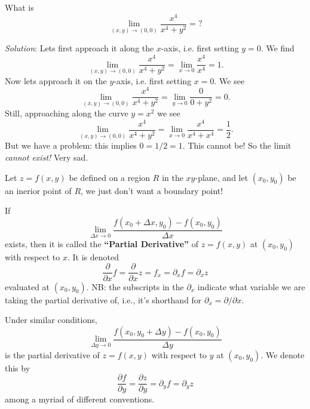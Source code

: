 \begin{example}
What is
\begin{equation}
\lim_{(x,y)\to(0,0)}\frac{x^{4}}{x^{4}+y^{2}}=?
\end{equation}

\emph{Solution}: Lets first approach it along the $x$-axis,
i.e. first setting $y=0$. We find
\begin{equation}
\lim_{(x,y)\to(0,0)}\frac{x^{4}}{x^{4}+y^{2}}=\lim_{x\to0}\frac{x^{4}}{x^{4}}=1.
\end{equation}
Now lets approach it on the $y$-axis, i.e. first setting
$x=0$. We see
\begin{equation}
\lim_{(x,y)\to(0,0)}\frac{x^{4}}{x^{4}+y^{2}}=\lim_{y\to0}\frac{0}{0+y^{2}}=0.
\end{equation}
Still, approaching along the curve $y=x^{2}$ we see
\begin{equation}
\lim_{(x,y)\to(0,0)}\frac{x^{4}}{x^{4}+y^{2}}=\lim_{x\to0}\frac{x^{4}}{x^{4}+x^{4}}=\frac{1}{2}.
\end{equation}
But we have a problem: this implies $0=1/2=1$. This cannot be! So
the limit \emph{cannot exist!} Very sad.
\end{example}


 Let $z=f(x,y)$ be defined on a region $R$ in the
$xy$-plane, and let $(x_{0},y_{0})$ be an inerior point of $R$,
we just don't want a boundary point!

If
\begin{equation}
\lim_{\Delta x\to0}\frac{f(x_{0}+\Delta
  x,y_{0})-f(x_{0},y_{0})}{\Delta x}
\end{equation}
exists, then it is called the \textbf{``Partial Derivative''} of
$z=f(x,y)$ at $(x_{0},y_{0})$ with respect to $x$. It is denoted
\begin{equation}
\frac{\partial}{\partial x}f = \frac{\partial}{\partial x}z
=f_{x} = \partial_{x}f = \partial_{x}z
\end{equation}
evaluated at $(x_{0},y_{0})$. NB: the subscripts in the
$\partial_{x}$ indicate what variable we are taking the partial
derivative of, i.e., it's shorthand for
$\partial_{x}=\partial/\partial x$.

Under similar conditions,
\begin{equation}
\lim_{\Delta y\to0}\frac{f(x_{0},y_{0}+\Delta y)-f(x_{0},y_{0})}{\Delta y}
\end{equation}
is the partial derivative of $z=f(x,y)$ with respect to $y$ at
$(x_{0},y_{0})$. We denote this by
\begin{equation}
\frac{\partial f}{\partial y}=\frac{\partial z}{\partial
  y}=\partial_{y}f = \partial_{y}z
\end{equation}
among a myriad of different conventions.

